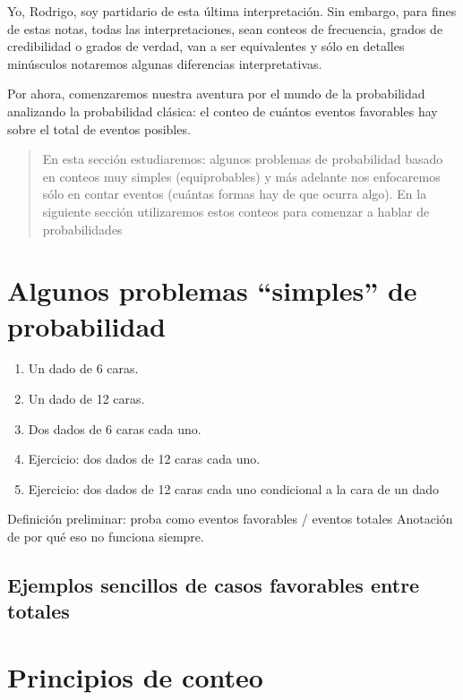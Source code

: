 \documentclass[
]{book}
\providecommand{\tightlist}{%
  \setlength{\itemsep}{0pt}\setlength{\parskip}{0pt}}
\begin{document}
Yo, Rodrigo, soy partidario de esta última interpretación. Sin embargo, para fines de estas notas, todas las interpretaciones, sean conteos de frecuencia, grados de credibilidad o grados de verdad, van a ser equivalentes y sólo en detalles minúsculos notaremos algunas diferencias interpretativas.

Por ahora, comenzaremos nuestra aventura por el mundo de la probabilidad analizando la probabilidad clásica: el conteo de cuántos eventos favorables hay sobre el total de eventos posibles.

\begin{quote}
En esta sección estudiaremos: algunos problemas de probabilidad basado en conteos muy simples (equiprobables) y más adelante nos enfocaremos sólo en contar eventos (cuántas formas hay de que ocurra algo). En la siguiente sección utilizaremos estos conteos para comenzar a hablar de probabilidades
\end{quote}

\hypertarget{algunos-problemas-simples-de-probabilidad}{%
\section{Algunos problemas ``simples'' de probabilidad}\label{algunos-problemas-simples-de-probabilidad}}

\begin{enumerate}
\def\labelenumi{\arabic{enumi}.}
\tightlist
\item
  Un dado de 6 caras.
\item
  Un dado de 12 caras.
\item
  Dos dados de 6 caras cada uno.
\item
  Ejercicio: dos dados de 12 caras cada uno.
\item
  Ejercicio: dos dados de 12 caras cada uno condicional a la cara de un dado
\end{enumerate}

Definición preliminar: proba como eventos favorables / eventos totales
Anotación de por qué eso no funciona siempre.

\hypertarget{ejemplos-sencillos-de-casos-favorables-entre-totales}{%
\subsection{Ejemplos sencillos de casos favorables entre totales}\label{ejemplos-sencillos-de-casos-favorables-entre-totales}}

\hypertarget{principios-de-conteo}{%
\section{Principios de conteo}\label{principios-de-conteo}}
\end{document}

